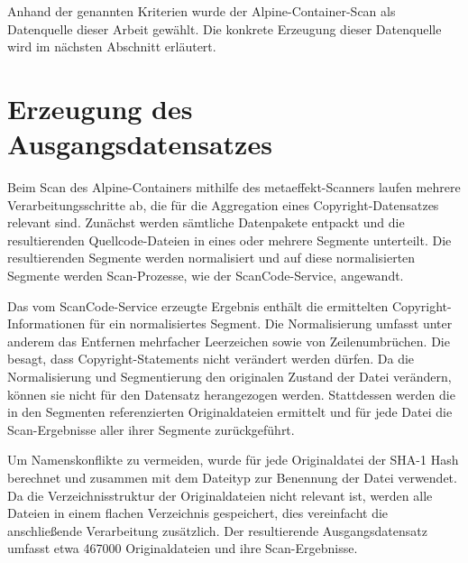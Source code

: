 Anhand der genannten Kriterien wurde der Alpine-Container-Scan als Datenquelle dieser Arbeit gewählt.
Die konkrete Erzeugung dieser Datenquelle wird im nächsten Abschnitt erläutert.


\section{Erzeugung des Ausgangsdatensatzes}\label{sec:erzeugung-datensatz}

Beim Scan des Alpine-Containers mithilfe des metaeffekt-Scanners laufen mehrere Verarbeitungsschritte ab, die für die Aggregation eines Copyright-Datensatzes relevant sind.
Zunächst werden sämtliche Datenpakete entpackt und die resultierenden Quellcode-Dateien in eines oder mehrere Segmente unterteilt.
Die resultierenden Segmente werden normalisiert und auf diese normalisierten Segmente werden Scan-Prozesse, wie der ScanCode-Service, angewandt.

Das vom ScanCode-Service erzeugte Ergebnis enthält die ermittelten Copyright-Informationen für ein normalisiertes Segment.
Die Normalisierung umfasst unter anderem das Entfernen mehrfacher Leerzeichen sowie von Zeilenumbrüchen.
Die  besagt, dass Copyright-Statements nicht verändert werden dürfen.
Da die Normalisierung und Segmentierung den originalen Zustand der Datei verändern, können sie nicht für den Datensatz herangezogen werden.
Stattdessen werden die in den Segmenten referenzierten Originaldateien ermittelt und für jede Datei die Scan-Ergebnisse aller ihrer Segmente zurückgeführt.

Um Namenskonflikte zu vermeiden, wurde für jede Originaldatei der SHA-1 Hash berechnet und zusammen mit dem Dateityp zur Benennung der Datei verwendet.
Da die Verzeichnisstruktur der Originaldateien nicht relevant ist, werden alle Dateien in einem flachen Verzeichnis gespeichert, dies vereinfacht die anschließende Verarbeitung zusätzlich.
Der resultierende Ausgangsdatensatz umfasst etwa \num{467000} Originaldateien und ihre Scan-Ergebnisse.


